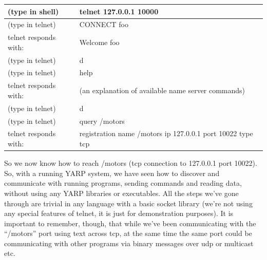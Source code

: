 \begin{tabular}{|l|p{8cm}|}
\hline
(type in shell) & telnet 127.0.0.1 10000 \\
\hline
(type in telnet) & CONNECT foo \\
\hline
telnet responds with: & Welcome foo \\
\hline
(type in telnet) & d \\
\hline
(type in telnet) & help \\
\hline
telnet responds with: & (an explanation of available name server commands) \\
\hline
(type in telnet) & d \\
\hline
(type in telnet) & query /motors \\
\hline
telnet responds with: & registration name /motors ip 127.0.0.1 port 10022 type tcp \\
\hline
\end{tabular}

So we now know how to reach /motors (tcp connection to 127.0.0.1 port 10022).
%
So, with a running YARP system, we have seen how to discover
and communicate with running programs, sending commands and reading
data, without using any YARP libraries or executables.  All the steps
we've gone through are trivial in any language with a basic socket
library (we're not using any special features of telnet, it is just
for demonstration purposes).  It is important to remember, though,
that while we've been communicating with the ``/motors'' port using
text across tcp, at the same time the same port could be communicating
with other programs via binary messages over udp or multicast etc.



